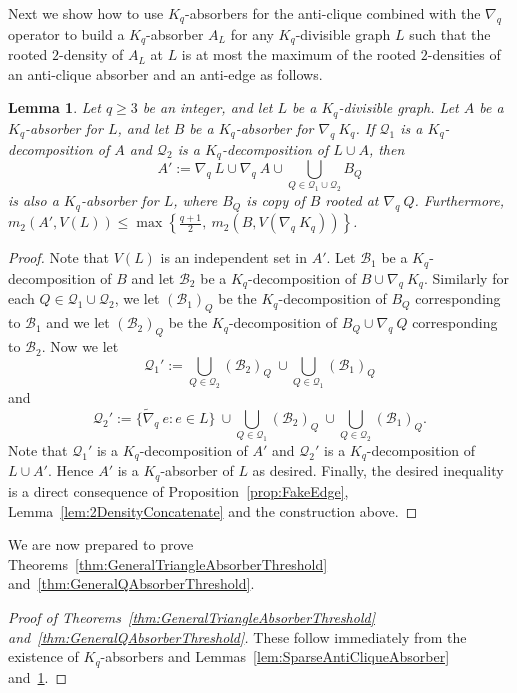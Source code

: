 \documentclass[11pt]{article}
\numberwithin{equation}{section}
\newcounter{i}
\theoremstyle{plain}
\newtheorem{lem}[thm]{Lemma}
\theoremstyle{plain} %
\theoremstyle{definition}
\begin{document}
Next we show how to use $K_q$-absorbers for the anti-clique combined with the $\nabla_q$ operator to build a $K_q$-absorber $A_L$ for any $K_q$-divisible graph $L$ such that the rooted $2$-density of $A_L$ at $L$ is at most the maximum of the rooted $2$-densities of an anti-clique absorber and an anti-edge as follows.

\begin{lem}\label{lem:NablaConstruction}
Let $q\ge 3$ be an integer, and let $L$ be a $K_q$-divisible graph. Let $A$ be a $K_q$-absorber for $L$, and let $B$ be a $K_q$-absorber for $\nabla_q~K_q$. If $\mathcal{Q}_1$ is a $K_q$-decomposition of $A$ and $\mathcal{Q}_2$ is a $K_q$-decomposition of $L\cup A$, then
$$A':=\nabla_q~L \cup \nabla_q~A\cup \bigcup_{Q\in \mathcal{Q}_1\cup\mathcal{Q}_2} B_Q$$
is also a $K_q$-absorber for $L$,
where $B_Q$ is copy of $B$ rooted at $\nabla_q~Q$.
Furthermore, $m_2(A',V(L)) \le \max\left\{\frac{q+1}{2},~m_2(B,V(\nabla_q~K_q))\right\}$.
\end{lem}
\begin{proof}
Note that $V(L)$ is an independent set in $A'$. Let $\mathcal{B}_1$ be a $K_q$-decomposition of $B$ and let $\mathcal{B}_2$ be a $K_q$-decomposition of $B\cup \nabla_q~K_q$. Similarly for each $Q\in \mathcal{Q}_1\cup\mathcal{Q}_2$, we let $(\mathcal{B}_1)_Q$ be the $K_q$-decomposition of $B_Q$ corresponding to $\mathcal{B}_1$ and we let $(\mathcal{B}_2)_Q$ be the $K_q$-decomposition of $B_Q\cup \nabla_q~Q$ corresponding to $\mathcal{B}_2$. Now we let
$$\mathcal{Q}_1' := \bigcup_{Q\in \mathcal{Q}_2} (\mathcal{B}_2)_Q~\cup \bigcup_{Q\in \mathcal{Q}_1} (\mathcal{B}_1)_Q$$
and
$$\mathcal{Q}_2' := \{\tilde{\nabla}_q~e:e\in L\}~\cup \bigcup_{Q\in \mathcal{Q}_1} (\mathcal{B}_2)_Q~\cup \bigcup_{Q\in \mathcal{Q}_2} (\mathcal{B}_1)_Q.$$
Note that $\mathcal{Q}_1'$ is a $K_q$-decomposition of $A'$ and $\mathcal{Q}_2'$ is a $K_q$-decomposition of $L\cup A'$. Hence $A'$ is a $K_q$-absorber of $L$ as desired. Finally, the desired inequality is a direct consequence of Proposition~\ref{prop:FakeEdge}, Lemma~\ref{lem:2DensityConcatenate} and the construction above.
\end{proof}

We are now prepared to prove Theorems~\ref{thm:GeneralTriangleAbsorberThreshold} and~\ref{thm:GeneralQAbsorberThreshold}.

\begin{proof}[Proof of Theorems~\ref{thm:GeneralTriangleAbsorberThreshold} and~\ref{thm:GeneralQAbsorberThreshold}]
These follow immediately from the existence of $K_q$-absorbers  and Lemmas~\ref{lem:SparseAntiCliqueAbsorber} and~\ref{lem:NablaConstruction}.
\end{proof}
\end{document}
